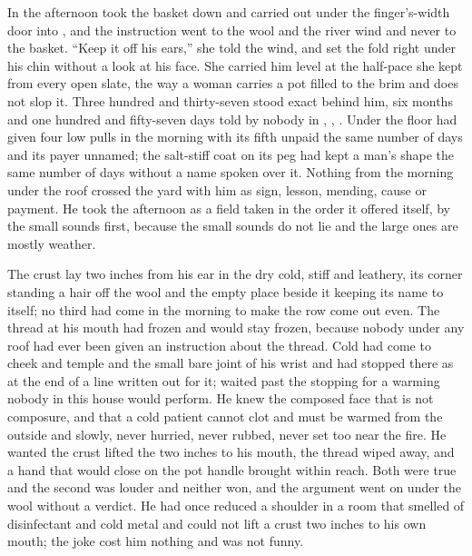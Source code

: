 In the afternoon  took the basket down and carried  out under the finger's-width door into , and the instruction went to the wool and the river wind and never to the basket. “Keep it off his ears,” she told the wind, and set the fold right under his chin without a look at his face. She carried him level at the half-pace she kept from every open slate, the way a woman carries a pot filled to the brim and does not slop it. Three hundred and thirty-seven stood exact behind him, six months and one hundred and fifty-seven days told by nobody in , , . Under the floor  had given four low pulls in the morning with its fifth unpaid the same number of days and its payer unnamed; the salt-stiff coat on its peg had kept a man's shape the same number of days without a name spoken over it. Nothing from the morning under the roof crossed the yard with him as sign, lesson, mending, cause or payment. He took the afternoon as a field taken in the order it offered itself, by the small sounds first, because the small sounds do not lie and the large ones are mostly weather.

The crust lay two inches from his ear in the dry cold, stiff and leathery, its corner standing a hair off the wool and the empty place beside it keeping its name to itself; no third had come in the morning to make the row come out even. The thread at his mouth had frozen and would stay frozen, because nobody under any roof had ever been given an instruction about the thread. Cold had come to cheek and temple and the small bare joint of his wrist and had stopped there as at the end of a line written out for it;  waited past the stopping for a warming nobody in this house would perform. He knew the composed face that is not composure, and that a cold patient cannot clot and must be warmed from the outside and slowly, never hurried, never rubbed, never set too near the fire. He wanted the crust lifted the two inches to his mouth, the thread wiped away, and a hand that would close on the pot handle brought within reach. Both were true and the second was louder and neither won, and the argument went on under the wool without a verdict. He had once reduced a shoulder in a room that smelled of disinfectant and cold metal and could not lift a crust two inches to his own mouth; the joke cost him nothing and was not funny.

